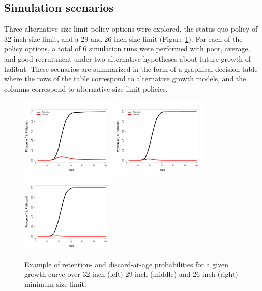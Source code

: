 
\subsection{Simulation scenarios} %
\label{sub:simulation_scenarios}
Three alternative size-limit policy options were explored, the status quo policy of 32 inch size limit, and a 29 and 26 inch size limit (Figure \ref{fig:FIGURES_SIZELIMIT_SelRetA}).  For each of the policy options, a total of 6 simulation runs were performed with poor, average, and good recruitment under two alternative hypotheses about future growth of halibut.  These scenarios are summarized in the form of a graphical decision table where the rows of the table correspond to alternative growth models, and the columns correspond to alternative size limit policies.
\begin{figure}[htbp]
	\centering
		\includegraphics[height=1.5in]{../FIGURES/SIZELIMIT/SelRetA.pdf}
		\includegraphics[height=1.5in]{../FIGURES/SIZELIMIT/SelRetC.pdf}
		\includegraphics[height=1.5in]{../FIGURES/SIZELIMIT/SelRetB.pdf}
	\caption{Example of retention- and discard-at-age probabilities for a given growth curve over 32 inch (left) 29 inch (middle) and 26 inch (right) minimum size limit.}
	\label{fig:FIGURES_SIZELIMIT_SelRetA}
\end{figure}



















